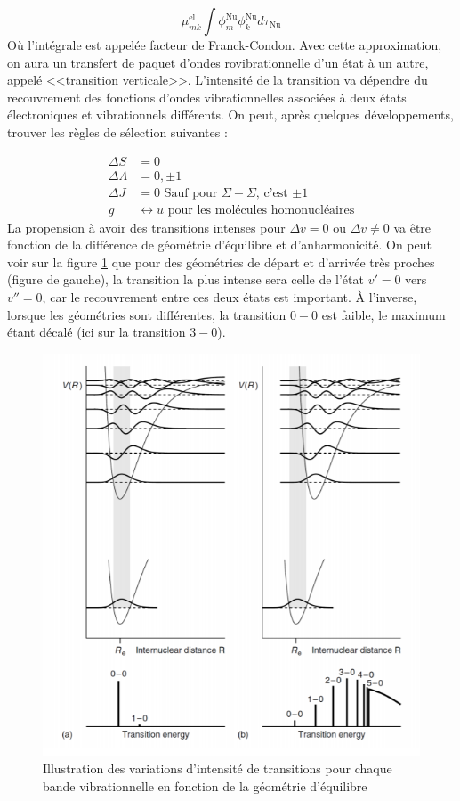 \[
    \mu^\text{el}_{mk} \int \phi^\text{Nu}_m\phi^\text{Nu}_kd\tau_\text{Nu}
\]
Où l'intégrale est appelée facteur de Franck-Condon. Avec cette approximation, on aura un transfert de paquet d'ondes rovibrationnelle d'un état à un autre, appelé <<transition verticale>>. L'intensité de la transition va dépendre du recouvrement des fonctions d'ondes vibrationnelles associées à deux états électroniques et vibrationnels différents. On peut, après quelques développements, trouver les règles de sélection suivantes :

\begin{align*}
    \Delta S &= 0\\
    \Delta\Lambda &= 0,\pm1\\
    \Delta J &= 0 \textrm{ Sauf pour $\Sigma-\Sigma$, c'est $\pm1$}\\
    g &\leftrightarrow u \textrm{ pour les molécules homonucléaires}
\end{align*}
La propension à avoir des transitions intenses pour $\Delta v = 0$ ou $\Delta v \neq 0$ va être fonction de la différence de géométrie d'équilibre et d'anharmonicité.
On peut voir sur la figure \ref{fig:recouvrement} que pour des géométries de départ et d'arrivée très proches (figure de gauche), la transition la plus intense sera celle de l'état $v'=0$ vers $v''=0$, car le recouvrement entre ces deux états est important. À l'inverse, lorsque les géométries sont différentes, la transition $0-0$ est faible, le maximum étant décalé (ici sur la transition $3-0$).
\begin{figure}
\centering
\includegraphics[scale=0.8]{Images3/Recouvrement.PNG}
\caption{Illustration des variations d'intensité de transitions pour chaque bande vibrationnelle en fonction de la géométrie d'équilibre}
\label{fig:recouvrement}
\end{figure}
